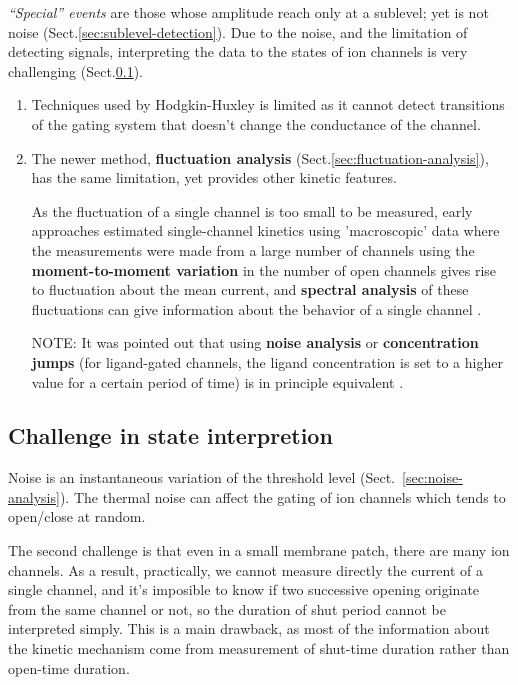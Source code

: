 {\it ``Special'' events} are those whose amplitude reach only at a sublevel; yet
is not noise (Sect.\ref{sec:sublevel-detection}).
Due to the noise, and the limitation of detecting signals, interpreting the data
to the states of ion channels is very challenging
(Sect.\ref{sec:challenge_state_interpretation}).
\begin{enumerate}
  \item  Techniques used by Hodgkin-Huxley \citep{hodgkin1952ap} is limited as
  it cannot detect transitions of the gating system that doesn't change the conductance of
the channel.


  \item The newer method, {\bf fluctuation analysis}
  (Sect.\ref{sec:fluctuation-analysis}), has the same limitation, yet provides
  other kinetic features.

As the fluctuation of a single channel is too small to be measured, early approaches estimated single-channel
kinetics using 'macroscopic' data where the measurements were made from a large
number of channels using the {\bf moment-to-moment variation} in the number of
open channels gives rise to fluctuation about the mean current, and {\bf
spectral analysis} of these fluctuations can give information about the behavior
of a single channel \citep{stevens1972}.

 NOTE: It was pointed out that using {\bf noise analysis} or {\bf
    concentration jumps} (for ligand-gated channels, the ligand concentration is
    set to a higher value for a certain period of time) is in principle
    equivalent \citep{colquhoun1977rfm}.
\end{enumerate}

\subsection{Challenge in state interpretion}
\label{sec:challenge_state_interpretation}

Noise is an instantaneous variation of the threshold level
(Sect.~\ref{sec:noise-analysis}). The thermal noise can affect the gating of ion
channels which tends to open/close at random.

The second challenge is that even in a small membrane patch, there are many ion
channels. As a result, practically, we cannot measure directly the current of a
single channel, and it's imposible to know if two successive opening originate
from the same channel or not, so the duration of shut period cannot be
interpreted simply. This is a main drawback, as most of the information about
the kinetic mechanism come from measurement of shut-time duration rather than
open-time duration.

